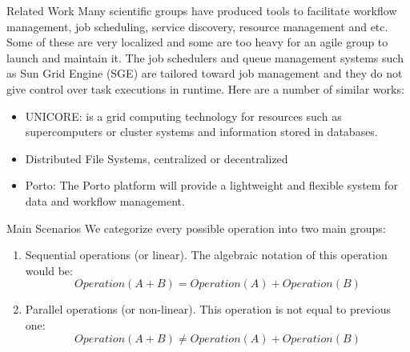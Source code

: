 \documentclass[final,hyperref={pdfpagelabels=true}]{beamer}
\begin{document}
\begin{frame}
\begin{columns}[t]
    \begin{column}{.45\textwidth}
      \begin{block}{Related Work}
        Many scientific groups have produced tools to facilitate workflow management, job scheduling,
        service discovery, resource management and etc. Some of these are very localized and some are
        too heavy for an agile group to launch and maintain it. The job schedulers and queue management
        systems such as Sun Grid Engine (SGE) are tailored toward job management and they do not give
        control over task executions in runtime.
        Here are a number of similar works:
        \begin{itemize}
        \item UNICORE: is a grid computing technology for resources such as supercomputers or cluster systems and information stored in databases.\cite{unicore}
        \item Distributed File Systems, centralized or decentralized
        \item Porto: The Porto platform will provide a lightweight and flexible system for data and workflow management.\cite{porto}
        \end{itemize}
      \end{block}
      
      \begin{block}{Main Scenarios}
      We categorize every possible operation into two main groups:
      \begin{enumerate}
      \item Sequential operations (or linear). The algebraic notation of this operation would be:
      \[ Operation(A + B) = Operation(A) + Operation(B) \]
      \item Parallel operations (or non-linear). This operation is not equal to previous one:
      \[ Operation(A + B) \neq Operation(A) + Operation(B) \]
      \end{enumerate}
      \end{block}
      

\end{column}
\end{columns}
\end{frame}
\end{document}
